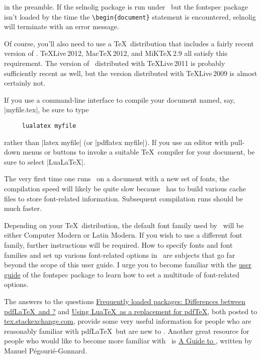 \documentclass[12pt]{article}
\newcommand{\pkg}[1]{\textsf{#1}}
\begin{document}
in the preamble. If the \pkg{selnolig} package is run under \LuaLaTeX\ but the \pkg{fontspec} package isn't loaded by the time the \Verb+\begin{document}+ statement is encountered, \pkg{selnolig} will terminate with an error message.

Of course, you'll also need to use a \TeX\ distribution that includes a fairly recent version of \LuaLaTeX. \TeX Live\,2012, Mac\TeX\,2012, and MiK\TeX\,2.9 all satisfy this requirement. The version of \LuaLaTeX\ distributed with TeXLive\,2011 is probably sufficiently recent as well, but the version distributed with TeXLive\,2009 is almost certainly not. 

If you use a command-line interface to compile your document named, say, |myfile.tex|, be sure to type 
\begin{Verbatim}
     lualatex myfile
\end{Verbatim}
rather than |latex myfile| (or |pdflatex myfile|). If you use an editor with pull-down menus or buttons to invoke a suitable \TeX\ compiler for your document, be sure to select |LuaLaTeX|. 

The very first time one runs \LuaLaTeX\ on a document with a new set of fonts, the compilation speed will likely be quite slow because \LuaLaTeX\ has to build various cache files to store font-related information. Subsequent compilation runs should be much faster. 

Depending on your \TeX\ distribution, the default font family used by \LuaLaTeX\ will be either Computer Modern or Latin Modern. If you wish to use a different font family, further instructions will be required. How to specify fonts and font families and set up various font-related options in \LuaLaTeX\ are subjects that go far beyond the scope of this user guide. I urge you to become familiar with the \href{http://www.ctan.org/tex-archive/macros/latex/contrib/fontspec/fontspec.pdf}{user guide} of the \pkg{fontspec} package to learn how to set a multitude of font-related options.

The answers to the questions \href{http://tex.stackexchange.com/q/28642/5001}{Frequently loaded packages: Differences between pdf\LaTeX\ and \LuaLaTeX?} and \href{http://tex.stackexchange.com/q/32295/5001}{Using Lua\TeX\ as a replacement for pdf\TeX}, both posted to \href{http://tex.stackexchange.com/}{tex.stackexchange.com}, provide some very useful information for people who are reasonably familiar with pdf\LaTeX\ but are new to \LuaLaTeX. Another great resource for people who would like to become more familiar with \LuaLaTeX\ is  \href{http://mirror.ctan.org/info/luatex/lualatex-doc/lualatex-doc.pdf}{A Guide to \LuaLaTeX}, written by Manuel Pégourié-Gonnard.



\end{document}
\end{document}
